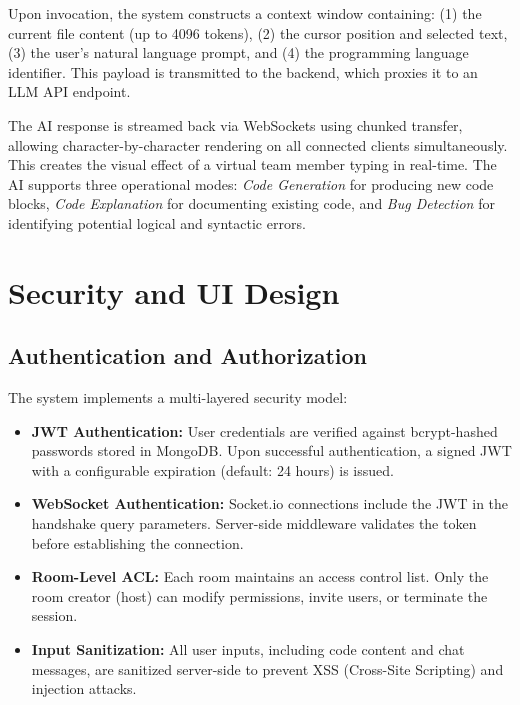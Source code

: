 \documentclass[conference]{IEEEtran}
\begin{document}
Upon invocation, the system constructs a context window containing: (1) the current file content (up to 4096 tokens), (2) the cursor position and selected text, (3) the user's natural language prompt, and (4) the programming language identifier. This payload is transmitted to the backend, which proxies it to an LLM API endpoint.

The AI response is streamed back via WebSockets using chunked transfer, allowing character-by-character rendering on all connected clients simultaneously. This creates the visual effect of a virtual team member typing in real-time. The AI supports three operational modes: \textit{Code Generation} for producing new code blocks, \textit{Code Explanation} for documenting existing code, and \textit{Bug Detection} for identifying potential logical and syntactic errors.

\section{Security and UI Design}

\subsection{Authentication and Authorization}
The system implements a multi-layered security model:
\begin{itemize}
    \item \textbf{JWT Authentication:} User credentials are verified against bcrypt-hashed passwords stored in MongoDB. Upon successful authentication, a signed JWT with a configurable expiration (default: 24 hours) is issued.
    \item \textbf{WebSocket Authentication:} Socket.io connections include the JWT in the handshake query parameters. Server-side middleware validates the token before establishing the connection.
    \item \textbf{Room-Level ACL:} Each room maintains an access control list. Only the room creator (host) can modify permissions, invite users, or terminate the session.
    \item \textbf{Input Sanitization:} All user inputs, including code content and chat messages, are sanitized server-side to prevent XSS (Cross-Site Scripting) and injection attacks.
\end{itemize}
\end{document}
